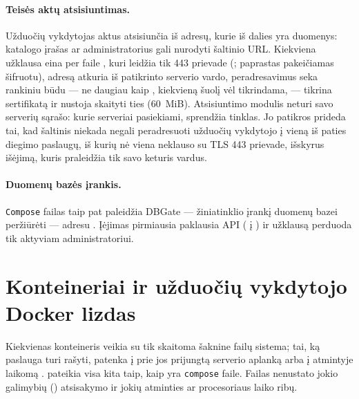\paragraph{Teisės aktų atsisiuntimas.} Užduočių vykdytojas aktus atsisiunčia iš adresų, kurie
iš dalies yra duomenys: katalogo įrašas ar administratorius gali nurodyti šaltinio URL.
Kiekviena užklausa eina per  faile , kuri leidžia tik
 443 prievade (; paprastas  pakeičiamas
šifruotu), adresą atkuria iš patikrinto serverio vardo, peradresavimus seka rankiniu būdu
--- ne daugiau kaip  \code{=} , kiekvieną šuolį vėl tikrindama, ---
tikrina sertifikatą ir nustoja skaityti ties  (60~MiB). Atsisiuntimo modulis
neturi savo serverių sąrašo: kurie serveriai pasiekiami, sprendžia tinklas. Jo patikros
prideda tai, kad šaltinis niekada negali peradresuoti užduočių vykdytojo į vieną iš paties
diegimo paslaugų, iš kurių nė viena neklauso su TLS 443 prievade, išskyrus išėjimą, kuris
praleidžia tik savo keturis vardus.

\paragraph{Duomenų bazės įrankis.} \texttt{Compose} failas taip pat paleidžia DBGate ---
žiniatinklio įrankį duomenų bazei peržiūrėti --- adresu . Įėjimas pirmiausia
paklausia API ( į ) ir užklausą
perduoda tik aktyviam administratoriui.


\section{Konteineriai ir užduočių vykdytojo Docker lizdas}\label{sec:security:containers}

Kiekvienas konteineris veikia su tik skaitoma šaknine failų sistema; tai, ką paslauga turi
rašyti, patenka į prie jos prijungtą serverio aplanką arba į atmintyje laikomą .
 pateikia visa kita taip, kaip yra \texttt{compose} faile.
Failas nenustato jokio galimybių () atsisakymo ir jokių atminties ar
procesoriaus laiko ribų.

